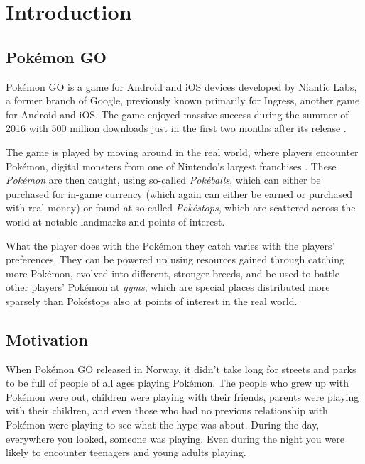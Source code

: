 
\chapter{Introduction}

\label{Chapter1}

\section{Pokémon GO}

Pokémon GO is a game for Android and iOS devices developed by Niantic Labs, a former branch of Google, previously known primarily for Ingress, another game for Android and iOS. The game enjoyed massive success during the summer of 2016 with 500 million downloads just in the first two months after its release .

The game is played by moving around in the real world, where players encounter Pokémon, digital monsters from one of Nintendo's largest franchises . These \emph{Pokémon} are then caught, using so-called \emph{Pokéballs}, which can either be purchased for in-game currency (which again can either be earned or purchased with real money) or found at so-called \emph{Pokéstops}, which are scattered across the world at notable landmarks and points of interest.

What the player does with the Pokémon they catch varies with the players' preferences. They can be powered up using resources gained through catching more Pokémon, evolved into different, stronger breeds, and be used to battle other players' Pokémon at \emph{gyms}, which are special places distributed more sparsely than Pokéstops also at points of interest in the real world.

\section{Motivation}

When Pokémon GO released in Norway, it didn't take long for streets and parks to be full of people of all ages playing Pokémon. The people who grew up with Pokémon were out, children were playing with their friends, parents were playing with their children, and even those who had no previous relationship with Pokémon were playing to see what the hype was about. During the day, everywhere you looked, someone was playing. Even during the night you were likely to encounter teenagers and young adults playing.

